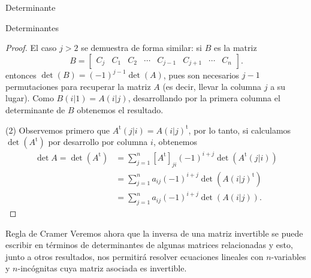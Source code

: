 \documentclass[a4paper,12pt,twoside,spanish,reqno]{amsbook}
\theoremstyle{definition}
\theoremstyle{remark}
\renewcommand{\t}{{\operatorname{t}}}
\begin{document}
\begin{chapter}{Determinante}
\begin{section}{Determinantes}
\begin{proof}
             El caso $j>2$  se demuestra de forma similar: si $B$ es la matriz
             $$
             B = \begin{bmatrix} C_j &C_1 &C_2 &\cdots& C_{j-1}&C_{j+1}&\cdots &C_n\end{bmatrix}.
             $$        
             entonces $\det(B)=(-1)^{j-1}\det(A)$, pues son necesarios $j-1$ permutaciones para recuperar la matriz $A$ (es decir, llevar la columna $j$ a su lugar).
             Como $B(i|1) = A(i|j)$,  desarrollando por la primera columna el determinante de $B$ obtenemos el resultado.  
             
             
             (2) Observemos primero que $A^\t(j|i) = A(i|j)^\t$, por lo tanto, si calculamos $\det(A^\t)$ por desarrollo por columna $i$, obtenemos 
             \begin{align*}
             \det A = \det(A^\t)&=\sum_{j=1}^{n} [A^\t]_{ji} (-1)^{i+j}\det (A^\t(j|i)) \\
             &=  \sum_{j=1}^{n} a_{ij} (-1)^{i+j}\det (A(i|j)^\t) \\
             &= \sum_{j=1}^{n} a_{ij} (-1)^{i+j}\det (A(i|j)).
             \end{align*}
             
             
         \end{proof}
         
         
        \end{section}
    
         
         
         \begin{section}{Regla de Cramer} Veremos ahora que la inversa de una matriz invertible se puede escribir en términos de determinantes de algunas matrices relacionadas y esto, junto a otros resultados, nos permitirá resolver ecuaciones lineales con $n$-variables y $n$-incógnitas cuya matriz asociada es invertible.  
             

\end{section}
\end{chapter}
\end{document}
